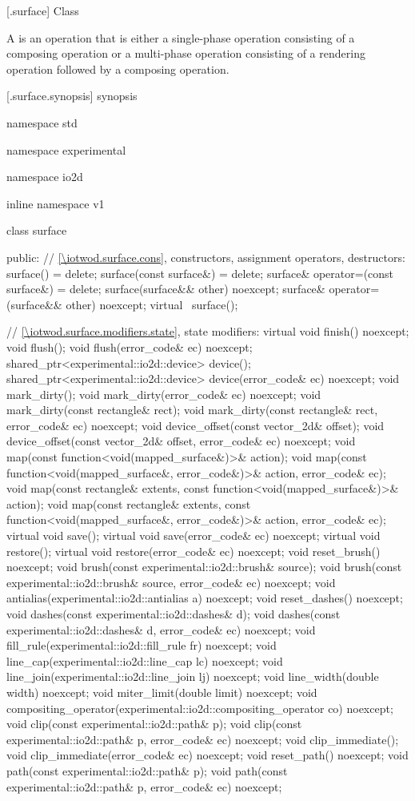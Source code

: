  [\iotwod.surface] {Class }

\pnum
A  is an operation that is either a single-phase operation consisting of a composing operation or a multi-phase operation consisting of a rendering operation followed by a composing operation.

 [\iotwod.surface.synopsis] { synopsis}

\begin{codeblock}
namespace std { namespace experimental { namespace io2d { inline namespace v1 {
  class surface {
  public:
    // \ref{\iotwod.surface.cons}, constructors, assignment operators, destructors:
    surface() = delete;
    surface(const surface&) = delete;
    surface& operator=(const surface&) = delete;
    surface(surface&& other) noexcept;
    surface& operator=(surface&& other) noexcept;
    virtual ~surface();

    // \ref{\iotwod.surface.modifiers.state}, state modifiers:
    virtual void finish() noexcept;
    void flush();
    void flush(error_code& ec) noexcept;
    shared_ptr<experimental::io2d::device> device();
    shared_ptr<experimental::io2d::device> device(error_code& ec) noexcept;
    void mark_dirty();
    void mark_dirty(error_code& ec) noexcept;
    void mark_dirty(const rectangle& rect);
    void mark_dirty(const rectangle& rect, error_code& ec) noexcept;
    void device_offset(const vector_2d& offset);
    void device_offset(const vector_2d& offset, error_code& ec) noexcept;
    void map(const function<void(mapped_surface&)>& action);
    void map(const function<void(mapped_surface&, error_code&)>& action,
      error_code& ec);
    void map(const rectangle& extents,
      const function<void(mapped_surface&)>& action);
    void map(const rectangle& extents,
      const function<void(mapped_surface&, error_code&)>& action,
      error_code& ec);
    virtual void save();
    virtual void save(error_code& ec) noexcept;
    virtual void restore();
    virtual void restore(error_code& ec) noexcept;
    void reset_brush() noexcept;
    void brush(const experimental::io2d::brush& source);
    void brush(const experimental::io2d::brush& source, error_code& ec)
      noexcept;
    void antialias(experimental::io2d::antialias a) noexcept;
    void reset_dashes() noexcept;
    void dashes(const experimental::io2d::dashes& d);
    void dashes(const experimental::io2d::dashes& d, error_code& ec) noexcept;
    void fill_rule(experimental::io2d::fill_rule fr) noexcept;
    void line_cap(experimental::io2d::line_cap lc) noexcept;
    void line_join(experimental::io2d::line_join lj) noexcept;
    void line_width(double width) noexcept;
    void miter_limit(double limit) noexcept;
    void compositing_operator(experimental::io2d::compositing_operator co)
      noexcept;
    void clip(const experimental::io2d::path& p);
    void clip(const experimental::io2d::path& p, error_code& ec) noexcept;
    void clip_immediate();
    void clip_immediate(error_code& ec) noexcept;
    void reset_path() noexcept;
    void path(const experimental::io2d::path& p);
    void path(const experimental::io2d::path& p, error_code& ec) noexcept;

}}}}}
\end{codeblock}
